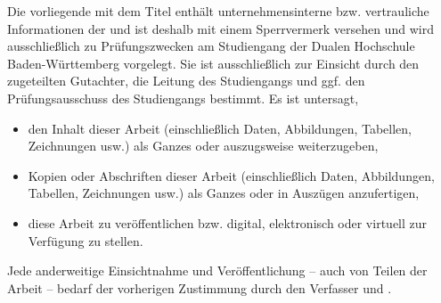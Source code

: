 Die vorliegende \sDocumentTypePhrase{} mit dem Titel \emph{\documentTitle}
enthält unternehmensinterne bzw. vertrauliche Informationen der 
\companyName{} und ist deshalb mit einem Sperrvermerk versehen und wird
ausschließlich zu Prüfungszwecken am Studiengang \department{} der Dualen
Hochschule Baden-Württemberg {\locationUniversity} vorgelegt.
Sie ist ausschließlich zur Einsicht durch den zugeteilten Gutachter, die
Leitung des Studiengangs und ggf. den Prüfungsausschuss des Studiengangs 
bestimmt.
Es ist untersagt,

\begin{itemize}
    \item den Inhalt dieser Arbeit (einschließlich Daten, Abbildungen, 
    Tabellen, Zeichnungen usw.) als Ganzes oder auszugsweise weiterzugeben,
    \item Kopien oder Abschriften dieser Arbeit (einschließlich Daten,
    Abbildungen, Tabellen, Zeichnungen usw.) als Ganzes oder in Auszügen
    anzufertigen,
    \item diese Arbeit zu veröffentlichen bzw. digital, elektronisch oder
    virtuell zur Verfügung zu stellen.
\end{itemize}

Jede anderweitige Einsichtnahme und Veröffentlichung -- auch von Teilen der
Arbeit -- bedarf der vorherigen Zustimmung durch den Verfasser und
\companyName{}.